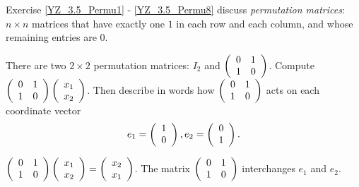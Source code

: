 \documentclass{ximera}
\begin{document}
Exercise \ref{YZ_3.5_Permu1} - \ref{YZ_3.5_Permu8} discuss \textit{permutation matrices}: $n\times n$ matrices that have exactly one $1$ in each row and each column, and whose remaining entries are $0$. 


\begin{exercise}\label{YZ_3.5_Permu1}
There are two $2\times 2$ permutation matrices: $I_2$ and $\Matrix{0&1\\1&0}$.
Compute $\Matrix{0&1\\1&0}\Matrix{x_1\\x_2}$. Then describe in words how $\Matrix{0&1\\1&0}$ acts on each coordinate vector
\[
e_1=\Matrix{1\\0}, e_2=\Matrix{0\\1}.
\]

\begin{solution}
\ans $\Matrix{0&1\\1&0}\Matrix{x_1\\x_2}=\Matrix{x_2\\x_1}$. The matrix $\Matrix{0&1\\1&0}$ interchanges $e_1$ and $e_2$.
\end{solution}
\end{exercise}
\end{document}
